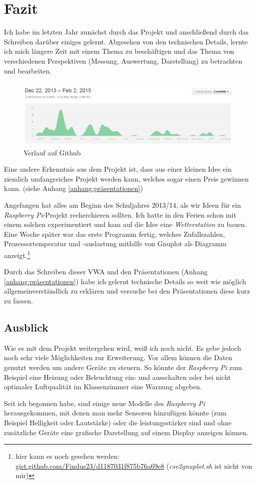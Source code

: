 \chapter{Fazit}
\label{cha:Fazit}
Ich habe im letzten Jahr zunächst durch das Projekt und anschließend durch das Schreiben darüber einiges gelernt. Abgesehen von den technischen Details, lernte ich mich längere Zeit mit einem Thema zu beschäftigen und das Thema von verschiedenen Perspektiven (Messung, Auswertung, Darstellung) zu betrachten und bearbeiten. 
\begin{figure}[h]
  \centering
     \includegraphics[width=\textwidth]{figures/Github_Umweltdatenmessung.png}
  \caption{Verlauf auf \gls{Github}}
  \label{fig:Github}
\end{figure}

Eine andere Erkenntnis aus dem Projekt ist, dass aus einer kleinen Idee ein ziemlich umfangreiches Projekt werden kann, welches sogar einen Preis gewinnen kann. (siehe Anhang \ref{anhang:präsentationen}) 

Angefangen hat alles am Beginn des Schuljahres 2013/14, als wir Ideen für ein \emph{Raspberry Pi}-Projekt recherchieren sollten. Ich hatte in den Ferien schon mit einem solchen experimentiert und kam auf die Idee eine \emph{Wetterstation} zu bauen. Eine Woche später war das erste Programm fertig, welches Zufallszahlen, Prozessortemperatur und -auslastung mithilfe von Gnuplot als Diagramm anzeigt.\footnote{hier kann es noch gesehen werden: \href{https://gist.github.com/Findus23/d1187031f875b76a69e8}{gist.github.com/Findus23/d1187031f875b76a69e8} (\emph{csv2gnuplot.sh} ist nicht von mir)}

Durch das Schreiben dieser VWA und den Präsentationen (Anhang \ref{anhang:präsentationen}) 
habe ich gelernt technische Details so weit wie möglich allgemeinverständlich zu erklären und versuche bei den Präsentationen diese kurz zu fassen.

\section{Ausblick}
Wie es mit dem Projekt weitergehen wird, weiß ich noch nicht. Es gebe jedoch noch sehr viele Möglichkeiten zur Erweiterung. Vor allem können die Daten genutzt werden um andere Geräte zu steuern. So könnte der \emph{Raspberry Pi} zum Beispiel eine Heizung oder Beleuchtung ein- und ausschalten oder bei nicht optimaler Luftqualität im Klassenzimmer eine Warnung abgeben. 

Seit ich begonnen habe, sind einige neue Modelle des \emph{Raspberry Pi} herausgekommen, mit denen man mehr Sensoren hinzufügen könnte (zum Beispiel Helligkeit oder Lautstärke) oder die leistungsstärker sind und ohne zusätzliche Geräte eine grafische Darstellung auf einem Display anzeigen können.